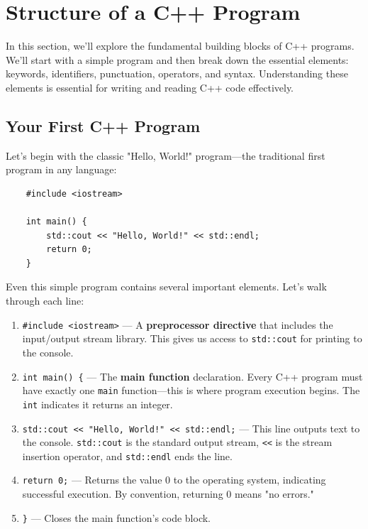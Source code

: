 \section{Structure of a C++ Program}

In this section, we'll explore the fundamental building blocks of C++ programs. We'll start with a simple program and then break down the essential elements: keywords, identifiers, punctuation, operators, and syntax. Understanding these elements is essential for writing and reading C++ code effectively.

\subsection{Your First C++ Program}

Let's begin with the classic "Hello, World!" program—the traditional first program in any language:

\begin{lstlisting}
	#include <iostream>
	
	int main() {
		std::cout << "Hello, World!" << std::endl;
		return 0;
	}
\end{lstlisting}

Even this simple program contains several important elements. Let's walk through each line:

\begin{enumerate}
	\item \texttt{\#include <iostream>} — A \textbf{preprocessor directive} that includes the input/output stream library. This gives us access to \texttt{std::cout} for printing to the console.
	
	\item \texttt{int main() \{} — The \textbf{main function} declaration. Every C++ program must have exactly one \texttt{main} function—this is where program execution begins. The \texttt{int} indicates it returns an integer.
	
	\item \texttt{std::cout << "Hello, World!" << std::endl;} — This line outputs text to the console. \texttt{std::cout} is the standard output stream, \texttt{<<} is the stream insertion operator, and \texttt{std::endl} ends the line.
	
	\item \texttt{return 0;} — Returns the value 0 to the operating system, indicating successful execution. By convention, returning 0 means "no errors."
	
	\item \texttt{\}} — Closes the main function's code block.
\end{enumerate}

